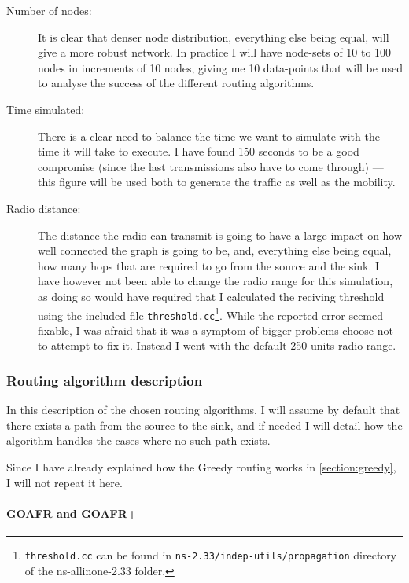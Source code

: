 \begin{description}
\item[Number of nodes:] It is clear that denser node distribution, everything else being equal, will give a more robust network. In practice I will have node-sets of 10 to 100 nodes in increments of 10 nodes, giving me 10 data-points that will be used to analyse the success of the different routing algorithms.

\item[Time simulated:] There is a clear need to balance the time we want to simulate with the time it will take to execute. I have found 150 seconds to be a good compromise (since the last transmissions also have to come through) --- this figure will be used both to generate the traffic as well as the mobility.

\item[Radio distance:] The distance the radio can transmit is going to have a large impact on how well connected the graph is going to be, and, everything else being equal, how many hops that are required to go from the source and the sink. I have however not been able to change the radio range for this simulation, as doing so would have required that I calculated the reciving threshold using the included file \texttt{threshold.cc}\footnote{\texttt{threshold.cc} can be found in \texttt{ns-2.33/indep-utils/propagation} directory of the ns-allinone-2.33 folder.}. While the reported error seemed fixable, I was afraid that it was a symptom of bigger problems choose not to attempt to fix it. Instead I went with the default 250 units radio range. 
\end{description}


\subsubsection{Routing algorithm description}
\label{section:routing_algorithm}
In this description of the chosen routing algorithms, I will assume by default that there exists a path from the source to the sink, and if needed I will detail how the algorithm handles the cases where no such path exists.

Since I have already explained how the Greedy routing works in \ref{section:greedy}, I will not repeat it here.

\paragraph{GOAFR and GOAFR+}


